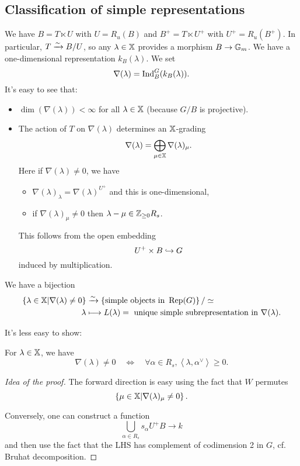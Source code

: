 \subsection{Classification of simple representations}
We have $B=T\ltimes U$ with $U=R_u(B)$ and $B^{+}=T\ltimes U^{+}$ with $U^{+}=R_u(B^{+})$. In particular, $T\xrightarrow{\sim} B /U$, so any $\lambda\in \mathbb{X}$ provides a morphism $B\to \Gm$. We have a one-dimensional representation $k_B(\lambda)$. We set
\[
\nabla(\lambda) = \operatorname{Ind}_B^{G}(k_B(\lambda)).
\] 
It's easy to see that:
\begin{itemize}
	\item $\dim(\nabla(\lambda))<\infty$ for all $\lambda\in \mathbb{X}$ (because $G /B$ is projective).
	\item The action of $T$ on $\nabla(\lambda)$ determines an $\mathbb{X}$-grading
		\[
		\nabla(\lambda) = \bigoplus_{\mu\in \mathbb{X}}\nabla(\lambda)_\mu.
		\] 
		Here if $\nabla(\lambda)\neq 0$, we have
		\begin{itemize}
			\item $\nabla(\lambda)_\lambda = \nabla(\lambda)^{U^{+}}$ and this is one-dimensional,
			\item if $\nabla(\lambda)_\mu \neq 0$ then $\lambda-\mu\in \mathbb Z_{\ge 0}R_s$.
		\end{itemize}
		This follows from the open embedding
		\[
		U^{+}\times B\hookrightarrow G
		\] 
		induced by multiplication.
\end{itemize}
\begin{corollary}
	We have a bijection 
	\begin{align*}
		\left\{ \lambda\in \XX \middle| \nabla(\lambda)\neq 0 \right\} &\simto \left\{ \text{simple objects in }\Rep(G) \right\} /\isoto \\
		\lambda &\mapsto L(\lambda) = \text{ unique simple subrepresentation in }\nabla(\lambda).
	\end{align*}
\end{corollary}
It's less easy to show:
\begin{proposition}
	For $\lambda\in \mathbb{X}$, we have
	\[
	\nabla(\lambda) \neq 0 \quad \iff\quad \forall \alpha\in R_s, \left<\lambda,\alpha ^{\vee} \right> \ge 0.
	\] 
\end{proposition}
\begin{proof}[Idea of the proof]
	The forward direction is easy using the fact that $W$ permutes
	\[
	\left\{ \mu\in \mathbb{X} \middle| \nabla(\lambda)_\mu \neq 0 \right\} .
	\] 

	Conversely, one can construct a function
	\[
	\bigcup_{\alpha\in R_s} s_\alpha U^{+}B\to k
	\] 
	and then use the fact that the LHS has complement of codimension 2 in $G$, cf. Bruhat decomposition.
\end{proof}
